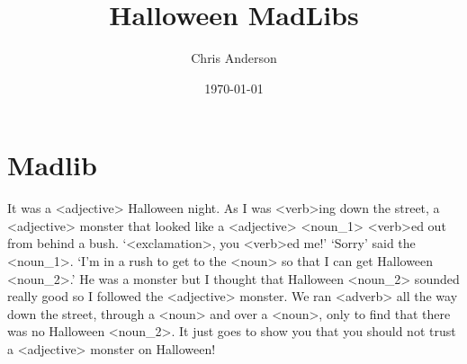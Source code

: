 \documentclass{article}
\title{Halloween MadLibs}
\author{Chris Anderson}
\date{\today}
\begin{document}
\maketitle

\section{Madlib}


It was a <adjective> Halloween night. As I was <verb>ing down the street, a <adjective>  monster that looked like  a <adjective>  <noun_1> <verb>ed out from behind a bush. `<exclamation>, you <verb>ed me!' `Sorry' said the <noun_1>. `I'm in a rush to get to the <noun> so that I can get Halloween <noun_2>.' He was a monster but I thought that Halloween <noun_2> sounded really good so I followed the <adjective>  monster. We ran <adverb> all the way down the street, through a <noun> and over a <noun>, only to find that there was no Halloween <noun_2>. It just goes to show you that you should not trust a <adjective> monster on Halloween!
\end{document}
